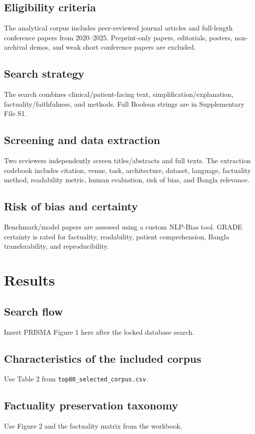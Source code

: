 \documentclass[review]{elsarticle}
\begin{document}
\subsection{Eligibility criteria}
The analytical corpus includes peer-reviewed journal articles and full-length conference papers from 2020--2025. Preprint-only papers, editorials, posters, non-archival demos, and weak short conference papers are excluded.

\subsection{Search strategy}
The search combines clinical/patient-facing text, simplification/explanation, factuality/faithfulness, and methods. Full Boolean strings are in Supplementary File S1.

\subsection{Screening and data extraction}
Two reviewers independently screen titles/abstracts and full texts. The extraction codebook includes citation, venue, task, architecture, dataset, language, factuality method, readability metric, human evaluation, risk of bias, and Bangla relevance.

\subsection{Risk of bias and certainty}
Benchmark/model papers are assessed using a custom NLP-Bias tool. GRADE certainty is rated for factuality, readability, patient comprehension, Bangla transferability, and reproducibility.

\section{Results}
\subsection{Search flow}
Insert PRISMA Figure 1 here after the locked database search.

\subsection{Characteristics of the included corpus}
Use Table 2 from \texttt{top80\_selected\_corpus.csv}.

\subsection{Factuality preservation taxonomy}
Use Figure 2 and the factuality matrix from the workbook.
\end{document}
